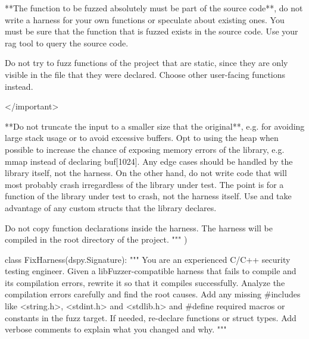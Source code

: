 \documentclass[
  a4paper,
]{scrreprt}
\newenvironment{Shaded}{\begin{snugshade}}{\end{snugshade}}
\newcommand{\CommentTok}[1]{\textcolor[rgb]{0.41,0.41,0.41}{#1}}
\newcommand{\KeywordTok}[1]{\textcolor[rgb]{0.85,0.12,0.09}{#1}}
\newcommand{\NormalTok}[1]{\textcolor[rgb]{0.33,0.33,0.33}{#1}}
\newcommand{\StringTok}[1]{\textcolor[rgb]{0.00,0.50,0.00}{#1}}
\theoremstyle{definition}
\theoremstyle{remark}
\begin{document}
\begin{Shaded}
\begin{Highlighting}[numbers=left,,]
\StringTok{        **The function to be fuzzed absolutely must be part of the source}
\StringTok{        code**, do not write a harness for your own functions or speculate about}
\StringTok{        existing ones. You must be sure that the function that is fuzzed exists}
\StringTok{        in the source code. Use your rag tool to query the source code.}

\StringTok{        Do not try to fuzz functions of the project that are static, since they}
\StringTok{        are only visible in the file that they were declared. Choose other}
\StringTok{        user{-}facing functions instead.}

\StringTok{        \textless{}/important\textgreater{}}

\StringTok{        **Do not truncate the input to a smaller size that the original**,}
\StringTok{        e.g. for avoiding large stack usage or to avoid excessive buffers. Opt}
\StringTok{        to using the heap when possible to increase the chance of exposing}
\StringTok{        memory errors of the library, e.g. mmap instead of declaring}
\StringTok{        buf[1024]. Any edge cases should be handled by the library itself, not}
\StringTok{        the harness. On the other hand, do not write code that will most}
\StringTok{        probably crash irregardless of the library under test. The point is for}
\StringTok{        a function of the library under test to crash, not the harness}
\StringTok{        itself. Use and take advantage of any custom structs that the library}
\StringTok{        declares.}

\StringTok{        Do not copy function declarations inside the harness. The harness will}
\StringTok{        be compiled in the root directory of the project.  """}
\NormalTok{    )}


\KeywordTok{class}\NormalTok{ FixHarness(dspy.Signature):}
    \CommentTok{"""}
\CommentTok{    You are an experienced C/C++ security testing engineer. Given a}
\CommentTok{    libFuzzer{-}compatible harness that fails to compile and its compilation}
\CommentTok{    errors, rewrite it so that it compiles successfully. Analyze the compilation}
\CommentTok{    errors carefully and find the root causes. Add any missing \#includes like}
\CommentTok{    \textless{}string.h\textgreater{}, \textless{}stdint.h\textgreater{} and \textless{}stdlib.h\textgreater{} and \#define required macros or}
\CommentTok{    constants in the fuzz target. If needed, re{-}declare functions or struct}
\CommentTok{    types. Add verbose comments to explain what you changed and why.}
\CommentTok{    """}


\end{Highlighting}
\end{Shaded}
\end{document}
